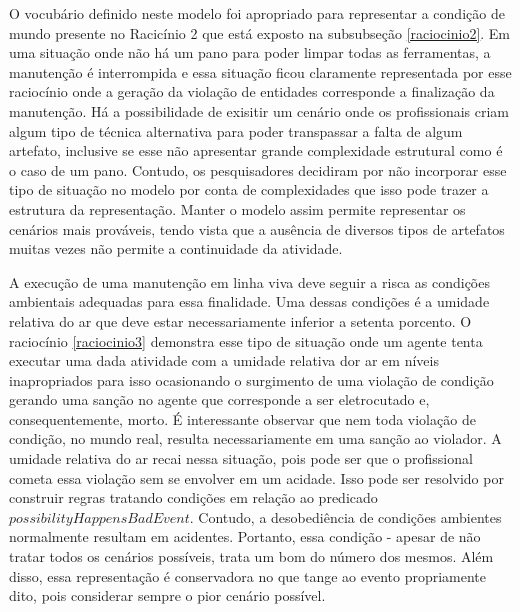 O vocubário definido neste modelo foi apropriado para representar a condição de mundo presente no Racicínio 2 que está exposto na subsubseção \ref{raciocinio2}. 
Em uma situação onde não há um pano para poder limpar todas as ferramentas, a manutenção é interrompida e essa situação ficou claramente representada por 
esse raciocínio onde a geração da violação de entidades corresponde a finalização da manutenção. Há a possibilidade de exisitir um cenário onde os 
profissionais criam algum tipo de técnica alternativa para poder transpassar a falta de algum artefato, inclusive se esse não apresentar grande complexidade 
estrutural como é o caso de um pano. Contudo, os pesquisadores decidiram por não incorporar esse tipo de situação no modelo por conta de complexidades que 
isso pode trazer a estrutura da representação. Manter o modelo assim permite representar os cenários mais prováveis, tendo vista que a ausência de diversos 
tipos de artefatos muitas vezes não permite a continuidade da atividade.    

A execução de uma manutenção em linha viva deve seguir a risca as condições ambientais adequadas para essa finalidade. Uma dessas condições é a umidade 
relativa do ar que deve estar necessariamente inferior a setenta porcento. O raciocínio \ref{raciocinio3} demonstra esse tipo de situação onde um agente 
tenta executar uma dada atividade com a umidade relativa dor ar em níveis inapropriados para isso ocasionando o surgimento de uma violação de condição 
gerando uma sanção no agente que corresponde a ser eletrocutado e, consequentemente, morto. É interessante observar que nem toda violação de condição, 
no mundo real, resulta necessariamente em uma sanção ao violador. A umidade relativa do ar recai nessa situação, pois pode ser que o profissional cometa
essa violação sem se envolver em um acidade. Isso pode ser resolvido por construir regras tratando condições em relação ao predicado $possibilityHappensBadEvent$.
Contudo, a desobediência de condições ambientes normalmente resultam em acidentes. Portanto, essa condição - apesar de não tratar todos os cenários possíveis, 
trata um bom do número dos mesmos. Além disso, essa representação é conservadora no que tange ao evento propriamente dito, pois considerar sempre o pior 
cenário possível.

